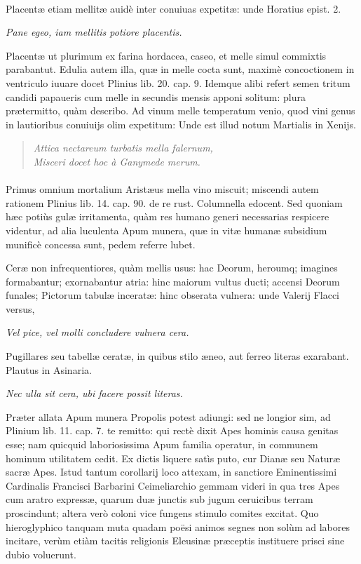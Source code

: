 \documentclass[a4paper, 11pt, oneside, polutonikogreek, latin]{article}
\begin{document}
\paragraph{}
Placentæ etiam mellitæ auidè inter conuiuas expetitæ: unde Horatius epist. 2.

\emph{Pane egeo, iam mellitis potiore placentis.}

Placentæ ut plurimum ex farina hordacea, caseo, et melle simul commixtis parabantut. Edulia autem illa, quæ in melle cocta sunt, maximè concoctionem in ventriculo iuuare docet Plinius lib. 20. cap. 9. Idemque alibi refert semen tritum candidi papaueris cum melle in secundis mensis apponi solitum: plura prætermitto, quàm describo. Ad vinum melle temperatum venio, quod vini genus in lautioribus conuiuijs olim expetitum: Unde est illud notum Martialis in Xenijs.
\begin{quote}
\emph{Attica nectareum turbatis mella falernum,}\\
\hspace*{10mm}\emph{Misceri docet hoc à Ganymede merum.}\\
\end{quote}
\paragraph{}
Primus omnium mortalium Aristæus mella vino miscuit; miscendi autem rationem Plinius lib. 14. cap. 90. de re rust. Columnella edocent. Sed quoniam hæc potiùs gulæ irritamenta, quàm res humano generi necessarias respicere videntur, ad alia luculenta Apum munera, quæ in vitæ humanæ subsidium munificè concessa sunt, pedem referre lubet.

Ceræ non infrequentiores, quàm mellis usus: hac Deorum, heroumq; imagines formabantur; exornabantur atria: hinc maiorum vultus ducti; accensi Deorum funales; Pictorum tabulæ inceratæ: hinc obserata vulnera: unde Valerij Flacci versus,

\emph{Vel pice, vel molli concludere vulnera cera.}

Pugillares seu tabellæ ceratæ, in quibus stilo æneo, aut ferreo literas exarabant. Plautus in Asinaria.

\emph{Nec ulla sit cera, ubi facere possit literas.}

Præter allata Apum munera Propolis potest adiungi: sed ne longior sim, ad Plinium lib. 11. cap. 7. te remitto: qui rectè dixit Apes hominis causa genitas esse; nam quicquid laboriosissima Apum familia operatur, in communem hominum utilitatem cedit. Ex dictis liquere satìs puto, cur Dianæ seu Naturæ sacræ Apes. Istud tantum corollarij loco attexam, in sanctiore Eminentissimi Cardinalis Francisci Barbarini Ceimeliarchio gemmam videri in qua tres Apes cum aratro expressæ, quarum duæ junctis sub jugum ceruicibus terram proscindunt; altera verò coloni vice fungens stimulo comites excitat. Quo hieroglyphico tanquam muta quadam poësi animos segnes non solùm ad labores incitare, verùm etiàm tacitis religionis Eleusinæ præceptis instituere prisci sine dubio voluerunt.
\clearpage
\end{document}
